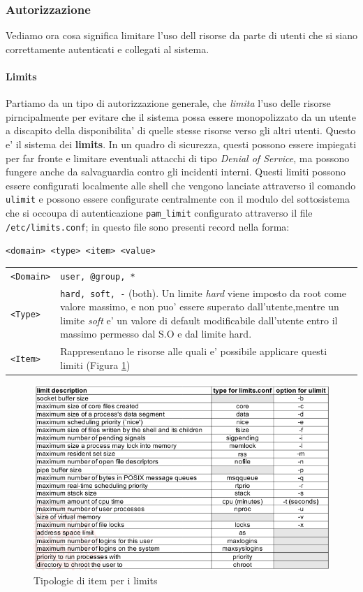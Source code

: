 \subsubsection{Autorizzazione}
Vediamo ora cosa significa limitare l'uso dell risorse da parte di utenti che si siano correttamente autenticati e collegati al sistema. 

\paragraph{Limits}
Partiamo da un tipo di autorizzazione generale, che \emph{limita} l'uso delle risorse pirncipalmente per evitare che il sistema possa essere monopolizzato da un utente a discapito della disponibilita' di quelle stesse risorse verso gli altri utenti. Questo e' il sistema dei \textbf{limits}. In un quadro di sicurezza, questi possono essere impiegati per far fronte e limitare eventuali attacchi di tipo \emph{Denial of Service}, ma possono fungere anche da salvaguardia contro gli incidenti interni. Questi limiti possono essere configurati localmente alle shell che vengono lanciate attraverso il comando \texttt{ulimit} e possono essere configurate centralmente con il modulo del sottosistema che si occoupa di autenticazione \texttt{pam\_limit} configurato attraverso il file \texttt{/etc/limits.conf}; in questo file sono presenti record nella forma:
\begin{center}
	\texttt{<domain> <type> <item> <value>}
\end{center}
\begin{tabular}{lp{12cm}}
	\texttt{<Domain>} & \texttt{user, @group, *} \\
	\texttt{<Type>} & \texttt{hard, soft, -} (both). Un limite \emph{hard} viene imposto da root come valore massimo, e non puo' essere superato dall'utente,mentre un limite \emph{soft} e' un valore di default modificabile dall'utente entro il massimo permesso dal S.O e dal limite hard.\\ 
	\texttt{<Item>} & Rappresentano le risorse alle quali e' possibile applicare questi limiti (Figura \ref{limitstype})
\end{tabular} 
\begin{figure}[H]
	\centering
	\includegraphics[scale=0.8]{img/typelimits.png}
	\caption{Tipologie di item per i limits}\label{limitstype}
\end{figure}

